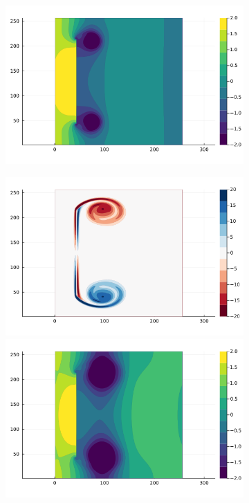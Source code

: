 \documentclass[preprint,12pt]{elsarticle}
\begin{document}
\begin{figure}
\begin{subfigure}{.33\textwidth}
        \includegraphics[trim={4cm 1.5cm 5cm 7cm},clip,width=\textwidth]{tex/fig/Disk_reflect_press_2.png}
    \end{subfigure}%
    \begin{subfigure}{.33\textwidth}
        \centering
         \includegraphics[trim={4cm 7.2cm 5cm 1cm},clip,width=\textwidth]{tex/fig/Disk_reflect_omega_3.png}
        \includegraphics[trim={4cm 1.5cm 5cm 7cm},clip,width=\textwidth]{tex/fig/Disk_reflect_press_3.png}

\end{subfigure}
\end{figure}
\end{document}

